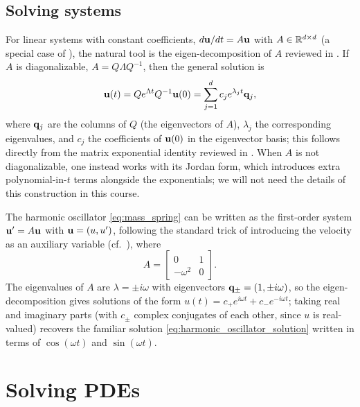 \subsection{Solving systems}

For linear systems with constant coefficients, $d\mathbf{u}/dt = A\mathbf{u}$ with
$A \in \mathbb{R}^{d \times d}$ (a special case of ), the natural
tool is the eigen-decomposition of $A$ reviewed in
. If $A$ is diagonalizable, $A = Q\Lambda
Q^{-1}$, then the general solution is
\begin{equation*}
    \mathbf{u}(t) = Qe^{\Lambda t} Q^{-1} \mathbf{u}(0) = \sum_{j=1}^d c_j
    e^{\lambda_j t} \mathbf{q}_j,
\end{equation*}
where $\mathbf{q}_j$ are the columns of $Q$ (the eigenvectors of $A$),
$\lambda_j$ the corresponding eigenvalues, and $c_j$ the coefficients
of $\mathbf{u}(0)$ in the eigenvector basis; this follows directly from the
matrix exponential identity reviewed in . When
$A$ is not diagonalizable, one instead works with its Jordan form,
which introduces extra polynomial-in-$t$ terms alongside the
exponentials; we will not need the details of this construction in
this course.

\begin{example}
    The harmonic oscillator \eqref{eq:mass_spring} can be written as
    the first-order system $\mathbf{u}' = A\mathbf{u}$ with $\mathbf{u} = (u,u')$, following
    the standard trick of introducing the velocity as an auxiliary
    variable (cf.\ ), where
    \begin{equation*}
        A = \begin{bmatrix} 0 & 1 \\ -\omega^2 & 0 \end{bmatrix}.
    \end{equation*}
    The eigenvalues of $A$ are $\lambda = \pm i\omega$ with eigenvectors
    $\mathbf{q}_\pm = (1, \pm i \omega)$, so the eigen-decomposition gives
    solutions of the form $u(t) = c_+ e^{i\omega t} + c_- e^{-i\omega
    t}$; taking real and imaginary parts (with $c_\pm$ complex
    conjugates of each other, since $u$ is real-valued) recovers the
    familiar solution \eqref{eq:harmonic_oscillator_solution} written
    in terms of $\cos(\omega t)$ and $\sin(\omega t)$.
\end{example}


\section{Solving PDEs}

